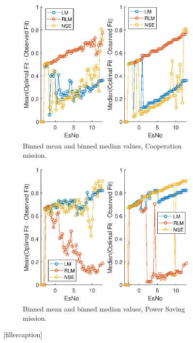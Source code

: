 \begin{figure}[ht]

\begin{subfigure}{0.50\linewidth}
\centering
\includegraphics[scale=0.6]{figures/c_sim_results/sim22_binnedMeanMedian.eps}
\caption{Binned mean and binned median values, Cooperation mission.}
\label{fig:cSimBinMeanMed}
\end{subfigure}%
\begin{subfigure}{0.50\linewidth}
\centering
\includegraphics[scale=0.6]{figures/c_sim_results/sim22_binnedMeanMedian_powersave.eps}
\caption{Binned mean and binned median values, Power Saving mission.}
\label{fig:cSimBinMeanMedPwr}
\end{subfigure}
\caption{[fillercaption]}
\label{fig:cSimBinMeanMed}
\end{figure}

